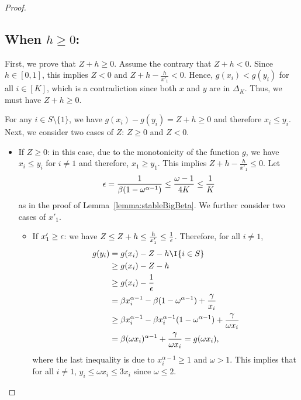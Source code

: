 \begin{proof}
    \subsection*{When $h \geq 0$:}
    First, we prove that $Z + h \geq 0$. Assume the contrary that $Z + h < 0$. Since $h \in [0,1]$, this implies $Z < 0$ and $Z + h - \frac{h}{x'_1} < 0$. Hence, $g(x_i) < g(y_i)$ for all $i \in [K]$, which is a contradiction since both $x$ and $y$ are in $\Delta_K$. Thus, we must have $Z + h \geq 0$.

    For any $i \in S \setminus \{1\}$, we have $g(x_i) - g(y_i) = Z + h \geq 0$ and therefore $x_i \leq y_i$. Next, we consider two cases of $Z$: $Z \geq 0$ and $Z < 0$.
    \begin{itemize}
        \item If $Z \geq 0$: in this case, due to the monotonicity of the function $g$, we have $x_i \leq y_i$ for $i \neq 1$ and therefore, $x_1 \geq y_1$. This implies $Z + h - \frac{h}{x'_1} \leq 0$. Let 
        \begin{align*}
            {\epsilon} = \frac{1}{\beta(1 - \omega^{\alpha-1})} \leq \frac{\omega - 1}{4K} \leq \frac{1}{K}
        \end{align*}
        as in the proof of Lemma~\ref{lemma:stableBigBeta}. We further consider two cases of $x'_1$.
        \begin{itemize}
            \item If $x'_1 \geq {\epsilon}$: we have $Z \leq Z + h \leq \frac{h}{x'_1} \leq \frac{1}{{\epsilon}}$. Therefore, for all $i \neq 1$, 
            \begin{align*}
                g(y_i) &= g(x_i) - Z - h\I{i \in S}  \\
                &\geq g(x_i) - Z - h \\
                &\geq g(x_i) - \frac{1}{\eps} \\
                &= \beta x_i^{\alpha - 1} - \beta(1-\omega^{\alpha-1}) + \frac{\gamma}{x_i} \\
                &\geq \beta x_i^{\alpha - 1} - \beta x_i^{\alpha-1}(1-\omega^{\alpha-1}) + \frac{\gamma}{\omega x_i} \\
                &= \beta (\omega x_i)^{\alpha-1} + \frac{\gamma}{\omega x_i} = g(\omega x_i),
            \end{align*}
            where the last inequality is due to $x_i^{\alpha-1} \geq 1$ and $\omega > 1$. This implies that for all $i \neq 1$, $y_i \leq \omega x_i \leq 3x_i$ since $\omega \leq 2$.


\end{itemize}
\end{itemize}
\end{proof}
